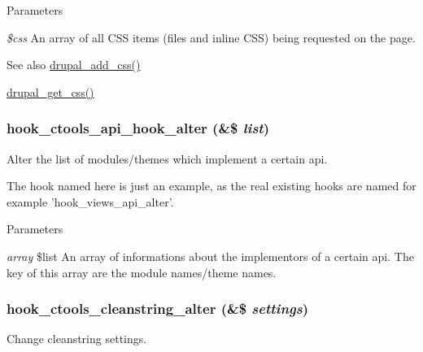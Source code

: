 \begin{DoxyParams}{Parameters}
\item[{\em \$css}]An array of all CSS items (files and inline CSS) being requested on the page.\end{DoxyParams}
\begin{DoxySeeAlso}{See also}
\hyperlink{common_8inc_a2c5bb2667efb44b02f1a105c0bfdebe5}{drupal\_\-add\_\-css()} 

\hyperlink{common_8inc_a2e308371f339fbb54967045ccbe4e88c}{drupal\_\-get\_\-css()} 
\end{DoxySeeAlso}
\hypertarget{group__hooks_gad31fa7973a09a182d52fc1bda3bd95a0}{
\subsubsection[{hook\_\-ctools\_\-api\_\-hook\_\-alter}]{\setlength{\rightskip}{0pt plus 5cm}hook\_\-ctools\_\-api\_\-hook\_\-alter (\&\$ {\em list})}}
\label{group__hooks_gad31fa7973a09a182d52fc1bda3bd95a0}
Alter the list of modules/themes which implement a certain api.

The hook named here is just an example, as the real existing hooks are named for example 'hook\_\-views\_\-api\_\-alter'.


\begin{DoxyParams}{Parameters}
\item[{\em array}]\$list An array of informations about the implementors of a certain api. The key of this array are the module names/theme names. \end{DoxyParams}
\hypertarget{group__hooks_ga8904abb33205b8553b560e08fd005e3a}{
\subsubsection[{hook\_\-ctools\_\-cleanstring\_\-alter}]{\setlength{\rightskip}{0pt plus 5cm}hook\_\-ctools\_\-cleanstring\_\-alter (\&\$ {\em settings})}}
\label{group__hooks_ga8904abb33205b8553b560e08fd005e3a}
Change cleanstring settings.


